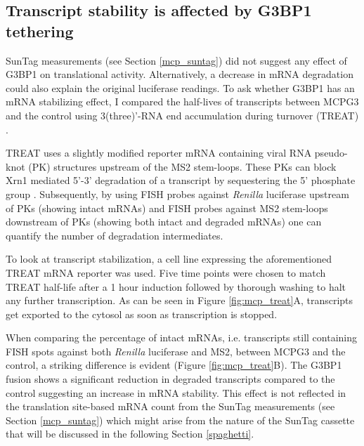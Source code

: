 \subsection{Transcript stability is affected by G3BP1 tethering} \label{mcp_treat}

SunTag measurements (see Section \ref{mcp_suntag}) did not suggest any effect of G3BP1 on translational activity.
Alternatively, a decrease in mRNA degradation could also explain the original luciferase readings.
To ask whether G3BP1 has an mRNA stabilizing effect, I compared the half-lives of transcripts between MCPG3 and the control using 3(three)'-RNA end accumulation during turnover (TREAT) \cite{horvathova_dynamics_2017}.

TREAT uses a slightly modified reporter mRNA containing viral RNA pseudo-knot (PK) structures upstream of the MS2 stem-loops.
These PKs can block Xrn1 mediated 5'-3' degradation of a transcript by sequestering the 5' phosphate group \cite{kieft_new_2015}.
Subsequently, by using FISH probes against \textit{Renilla} luciferase upstream of PKs (showing intact mRNAs) and FISH probes against MS2 stem-loops downstream of PKs (showing both intact and degraded mRNAs) one can quantify the number of degradation intermediates.

To look at transcript stabilization, a cell line expressing the aforementioned TREAT mRNA reporter was used.
Five time points were chosen to match TREAT half-life after a 1 hour induction followed by thorough washing to halt any further transcription.
As can be seen in Figure \ref{fig:mcp_treat}A, transcripts get exported to the cytosol as soon as transcription is stopped.

When comparing the percentage of intact mRNAs, i.e. transcripts still containing FISH spots against both \textit{Renilla} luciferase and MS2, between MCPG3 and the control, a striking difference is evident (Figure \ref{fig:mcp_treat}B).
The G3BP1 fusion shows a significant reduction in degraded transcripts compared to the control suggesting an increase in mRNA stability.
This effect is not reflected in the translation site-based mRNA count from the SunTag measurements (see Section \ref{mcp_suntag}) which might arise from the nature of the SunTag cassette that will be discussed in the following Section \ref{spaghetti}.


